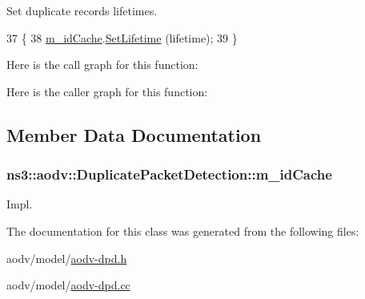 Set duplicate records lifetimes. 


\begin{DoxyCode}
37 \{
38   \hyperlink{classns3_1_1aodv_1_1DuplicatePacketDetection_a1c9b3e2a03e9f23dd06a3c837a9cea2b}{m\_idCache}.\hyperlink{classns3_1_1aodv_1_1IdCache_a39a2377540292d98cfa29b2db6cb7cd9}{SetLifetime} (lifetime);
39 \}
\end{DoxyCode}


Here is the call graph for this function\+:




Here is the caller graph for this function\+:




\subsection{Member Data Documentation}
\subsubsection[{\texorpdfstring{m\+\_\+id\+Cache}{m_idCache}}]{ ns3\+::aodv\+::\+Duplicate\+Packet\+Detection\+::m\+\_\+id\+Cache\hspace{0.3cm}{\ttfamily [private]}}\hypertarget{classns3_1_1aodv_1_1DuplicatePacketDetection_a1c9b3e2a03e9f23dd06a3c837a9cea2b}{}\label{classns3_1_1aodv_1_1DuplicatePacketDetection_a1c9b3e2a03e9f23dd06a3c837a9cea2b}


Impl. 



The documentation for this class was generated from the following files\+:\begin{DoxyCompactItemize}
\item 
aodv/model/\hyperlink{aodv-dpd_8h}{aodv-\/dpd.\+h}\item 
aodv/model/\hyperlink{aodv-dpd_8cc}{aodv-\/dpd.\+cc}\end{DoxyCompactItemize}
